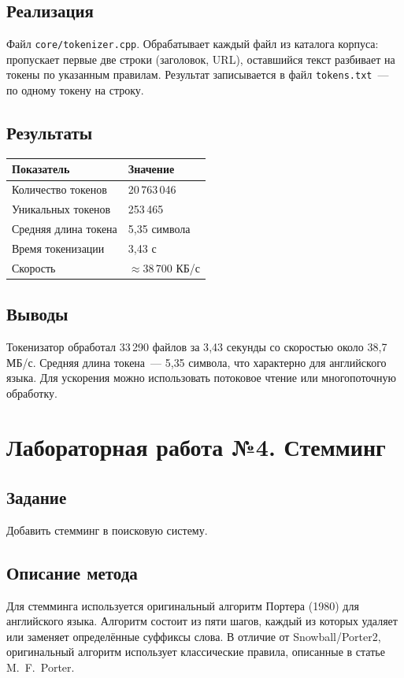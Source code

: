 \documentclass[12pt,a4paper]{article}
\begin{document}
\subsection{Реализация}
Файл \texttt{core/tokenizer.cpp}. Обрабатывает каждый файл из каталога корпуса:
пропускает первые две строки (заголовок, URL), оставшийся текст разбивает на токены
по указанным правилам. Результат записывается в файл \texttt{tokens.txt}~--- по одному
токену на строку.

\subsection{Результаты}
\begin{table}[H]
\centering
\begin{tabular}{ll}
\toprule
\textbf{Показатель} & \textbf{Значение} \\
\midrule
Количество токенов & 20\,763\,046 \\
Уникальных токенов & 253\,465 \\
Средняя длина токена & 5{,}35 символа \\
Время токенизации & 3{,}43 с \\
Скорость & $\approx$38\,700 КБ/с \\
\bottomrule
\end{tabular}
\end{table}

\subsection{Выводы}
Токенизатор обработал 33\,290 файлов за 3{,}43 секунды со скоростью
около 38{,}7 МБ/с. Средняя длина токена~--- 5{,}35 символа, что характерно
для английского языка. Для ускорения можно использовать потоковое чтение
или многопоточную обработку.

\section{Лабораторная работа №4. Стемминг}

\subsection{Задание}
Добавить стемминг в поисковую систему.

\subsection{Описание метода}
Для стемминга используется оригинальный алгоритм Портера (1980) для английского языка.
Алгоритм состоит из пяти шагов, каждый из которых удаляет или заменяет определённые
суффиксы слова. В отличие от Snowball/Porter2, оригинальный алгоритм использует
классические правила, описанные в статье M.~F.~Porter.
\end{document}
